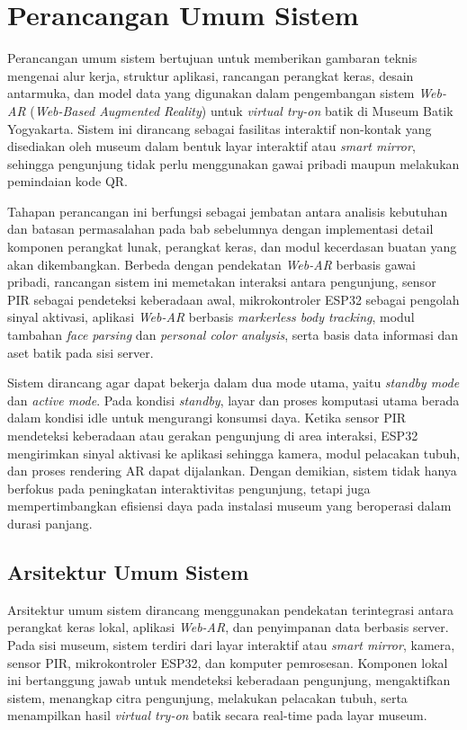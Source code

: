 \section{Perancangan Umum Sistem}
\label{sec:perancangan_umum_sistem}

Perancangan umum sistem bertujuan untuk memberikan gambaran teknis mengenai alur kerja, struktur aplikasi, rancangan perangkat keras, desain antarmuka, dan model data yang digunakan dalam pengembangan sistem \textit{Web-AR} (\textit{Web-Based Augmented Reality}) untuk \textit{virtual try-on} batik di Museum Batik Yogyakarta. Sistem ini dirancang sebagai fasilitas interaktif non-kontak yang disediakan oleh museum dalam bentuk layar interaktif atau \textit{smart mirror}, sehingga pengunjung tidak perlu menggunakan gawai pribadi maupun melakukan pemindaian kode QR.

Tahapan perancangan ini berfungsi sebagai jembatan antara analisis kebutuhan dan batasan permasalahan pada bab sebelumnya dengan implementasi detail komponen perangkat lunak, perangkat keras, dan modul kecerdasan buatan yang akan dikembangkan. Berbeda dengan pendekatan \textit{Web-AR} berbasis gawai pribadi, rancangan sistem ini memetakan interaksi antara pengunjung, sensor PIR sebagai pendeteksi keberadaan awal, mikrokontroler ESP32 sebagai pengolah sinyal aktivasi, aplikasi \textit{Web-AR} berbasis \textit{markerless body tracking}, modul tambahan \textit{face parsing} dan \textit{personal color analysis}, serta basis data informasi dan aset batik pada sisi server.

Sistem dirancang agar dapat bekerja dalam dua mode utama, yaitu \textit{standby mode} dan \textit{active mode}. Pada kondisi \textit{standby}, layar dan proses komputasi utama berada dalam kondisi idle untuk mengurangi konsumsi daya. Ketika sensor PIR mendeteksi keberadaan atau gerakan pengunjung di area interaksi, ESP32 mengirimkan sinyal aktivasi ke aplikasi sehingga kamera, modul pelacakan tubuh, dan proses rendering AR dapat dijalankan. Dengan demikian, sistem tidak hanya berfokus pada peningkatan interaktivitas pengunjung, tetapi juga mempertimbangkan efisiensi daya pada instalasi museum yang beroperasi dalam durasi panjang.

\subsection{Arsitektur Umum Sistem}
\label{subsec:arsitektur_umum_sistem}

Arsitektur umum sistem dirancang menggunakan pendekatan terintegrasi antara perangkat keras lokal, aplikasi \textit{Web-AR}, dan penyimpanan data berbasis server. Pada sisi museum, sistem terdiri dari layar interaktif atau \textit{smart mirror}, kamera, sensor PIR, mikrokontroler ESP32, dan komputer pemrosesan. Komponen lokal ini bertanggung jawab untuk mendeteksi keberadaan pengunjung, mengaktifkan sistem, menangkap citra pengunjung, melakukan pelacakan tubuh, serta menampilkan hasil \textit{virtual try-on} batik secara real-time pada layar museum.

